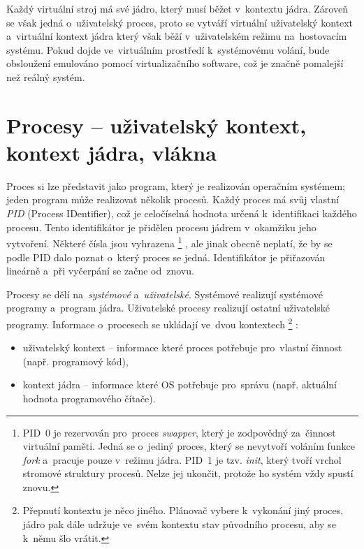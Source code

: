 Každý virtuální stroj má své jádro, který musí běžet v~kontextu jádra. Zároveň se však jedná o~uživatelský proces, proto se vytváří virtuální uživatelský kontext a~virtuální kontext jádra který však běží v~uživatelském režimu na~hostovacím systému. Pokud dojde ve~virtuálním prostředí k~systémovému volání, bude obsloužení emulováno pomocí virtualizačního software, což je značně pomalejší než reálný systém.


\clearpage
\section{Procesy -- uživatelský kontext, kontext jádra, vlákna}
\label{procesy}

Proces si lze představit jako program, který je realizován operačním systémem; jeden program může realizovat několik procesů. Každý proces má svůj vlastní \emph{PID} (Process IDentifier), což je celočíselná hodnota určená k~identifikaci každého procesu. Tento identifikátor je přidělen procesu jádrem v~okamžiku jeho vytvoření. Některé čísla jsou vyhrazena%
\footnote{PID~0 je rezervován pro~proces \emph{swapper}, který je zodpovědný za~činnost virtuální paměti. Jedná se o~jediný proces, který se nevytvoří voláním funkce \emph{fork} a~pracuje pouze v~režimu jádra. PID~1 je tzv. \emph{init}, který tvoří vrchol stromové struktury procesů. Nelze jej ukončit, protože ho systém vždy spustí znovu.}%
, ale jinak obecně neplatí, že by se podle PID dalo poznat o~který proces se jedná. Identifikátor je přiřazován lineárně a~při vyčerpání se začne od~znovu.

Procesy se dělí na~\emph{systémové} a~\emph{uživatelské}. Systémové realizují systémové programy a~program jádra. Uživatelské procesy realizují ostatní uživatelské programy. Informace o~procesech se ukládají ve~dvou kontextech%
\footnote{Přepnutí kontextu je něco jiného. Plánovač vybere k~vykonání jiný proces, jádro pak dále udržuje ve~svém kontextu stav původního procesu, aby se k~němu šlo vrátit.}%
:

\begin{itemize}
	\item uživatelský kontext -- informace které proces potřebuje pro~vlastní činnost (např. programový kód),
	\item kontext jádra -- informace které OS potřebuje pro~správu (např. aktuální hodnota programového čítače).
\end{itemize}

